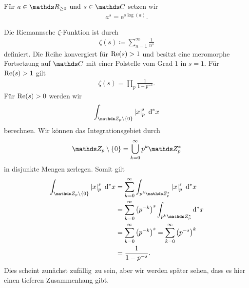 Für $a \in \R_{\geq 0}$ und $s\in \C$ setzen wir
\begin{align*}
a^s=\mathrm{e}^{s \log(a)}.
\end{align*}

Die Riemannsche $\zeta$-Funktion ist durch
\begin{align*}
\zeta(s)\coloneqq \sum_{n=1}^\infty \frac{1}{n^s}
\end{align*}
definiert.
Die Reihe konvergiert für $\operatorname{Re}(s)>1$ und besitzt eine meromorphe Fortsetzung auf $\C$ mit einer Polstelle vom Grad $1$ in $s=1$.
Für $\operatorname{Re}(s)>1$ gilt
\begin{align*}
\zeta(s)=\prod_p \frac{1}{1-p^{-s}}.
\end{align*}
Für $\operatorname{Re}(s)>0$ werden wir
\begin{align*}
\int_{\Z_p \setminus \{0\}} \abs{x}_p^s ~\mathrm{d}^\ast x
\end{align*}
berechnen.
Wir können das Integrationsgebiet durch
\begin{align*}
\Z_p\setminus \{0\}=\bigcup_{k=0}^\infty p^k \Z_p^\ast
\end{align*}
in disjunkte Mengen zerlegen.
Somit gilt
\begin{align*}
\int_{\Z_p \setminus \{0\}} \abs{x}_p^s ~\mathrm{d}^\ast x&=\sum_{k=0}^\infty \int_{p^k \Z_p^\ast} \abs{x}_p^s ~\mathrm{d}^\ast x\\
&=\sum_{k=0}^\infty \left(p^{-k}\right)^s \int_{p^k \Z_p^\ast}\mathrm{d}^\ast x \\
&=\sum_{k=0}^\infty \left(p^{-k}\right)^s=\sum_{k=0}^\infty \left(p^{-s}\right)^k\\
&=\frac{1}{1-p^{-s}}.
\end{align*}
Dies scheint zunächst \glqq zufällig\grqq\, zu sein, aber wir werden später sehen, dass es hier einen tieferen Zusammenhang gibt.